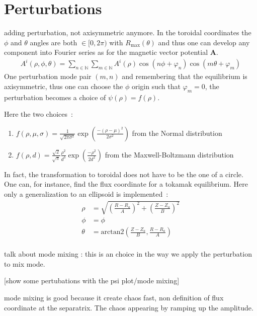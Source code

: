 \section{Perturbations}
adding perturbation, not axisymmetric anymore. In the toroidal coordinates the $\phi$ and $\theta$ angles are both $\in [0, 2\pi)$ with $R_\text{max}(\theta)$ and thus one can develop any component into Fourier series as for the magnetic vector potential $\textbf{A}$.
\begin{align*}
    A^i(\rho,\phi,\theta) = \sum\limits_{n\in\mathbb{N}}\sum\limits_{m\in\mathbb{N}} A^i(\rho)\cos(n\phi + \varphi_n)\cos(m\theta + \varphi_m)
\end{align*}
One perturbation mode pair $(m,n)$ and remembering that the equilibrium is axisymmetric, thus one can choose the $\phi$ origin such that $\varphi_m = 0$, the perturbation becomes a choice of $\psi(\rho) = f(\rho)$.

Here the two choices~:

\begin{enumerate}
    \item $f(\rho, \mu, \sigma) = \frac{1}{\sqrt{2\pi\sigma^2}}\exp\left(\frac{-(\rho-\mu)^2}{2\sigma^2}\right)$ from the Normal distribution
    
    \item $f(\rho, d) = \frac{\sqrt{2}}{\sqrt{\pi}}\frac{\rho^2}{d^3}\exp\left(\frac{-\rho^2}{2d^2}\right)$ from the Maxwell-Boltzmann distribution
\end{enumerate}

In fact, the transformation to toroidal does not have to be the one of a circle. One can, for instance, find the flux coordinate for a tokamak equilibrium. Here only a generalization to an ellipsoid is implemented~:
\begin{align*}
    \rho &= \sqrt{\left(\frac{R-R_a}{A}\right)^2 + \left(\frac{Z-Z_a}{B}\right)^2}\\
    \phi &= \phi\\
    \theta &= \text{arctan2}(\frac{Z-Z_a}{B}, \frac{R-R_a}{A})\\
\end{align*}

talk about mode mixing : this is an choice in the way we apply the perturbation to mix mode.

[show some pertubations with the psi plot/mode mixing]

mode mixing is good because it create chaos fast, non definition of flux coordinate at the separatrix. The chaos appearing by ramping up the amplitude.

